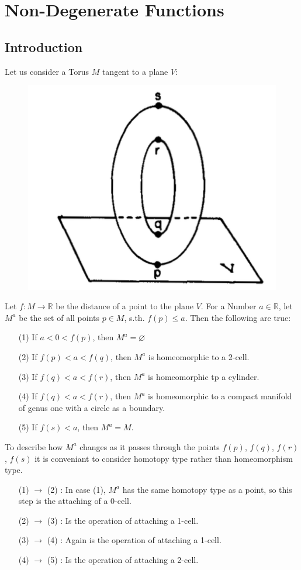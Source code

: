 \documentclass[a4paper,11pt]{article}
\begin{document}
\section{Non-Degenerate Functions}

\subsection{Introduction}

Let us consider a Torus $M$ tangent to a plane $V$:
\begin{figure}[H]
    \centering
    \includegraphics[width=0.4\linewidth]{resources/Diagram1.png}
    \label{fig:diagram1}
\end{figure}
Let $f: M \rightarrow \mathbb{R}$ be the distance of a point to the plane $V$. 
For a Number $a \in \mathbb{R} $, let $M^a$ be the set of all points $p \in M$, s.th. $f(p) \leq a$.
Then the following are true:
\begin{enumerate}
   \item[(1)] If $a < 0 < f(p)$, then $M^a = \varnothing$
   \item[(2)] If $f(p) < a < f(q)$, then $M^a$ is homeomorphic to a 2-cell.
   \item[(3)] If $f(q) < a < f(r)$, then $M^a$ is homeomorphic tp a cylinder.
   \item[(4)] If $f(q) < a < f(r)$, then $M^a$ is homeomorphic to a compact manifold of genus one with a circle as a boundary.
   \item[(5)] If $f(s) < a$, then $M^a = M$.
\end{enumerate}

To describe how $M^a$ changes as it passes through the points $f(p)$, $f(q)$, $f(r)$, $f(s)$ it is conveniant to consider
homotopy type rather than homeomorphism type. 
\begin{enumerate}[leftmargin=2cm]
   \item[(1) $\rightarrow$ (2)]: In case (1), $M^a$ has the same homotopy type as a point, so this step is the attaching of a 0-cell. 
   \item[(2) $\rightarrow$ (3)]: Is the operation of attaching a 1-cell. 
   \item[(3) $\rightarrow$ (4)]: Again is the operation of attaching a 1-cell. 
   \item[(4) $\rightarrow$ (5)]: Is the operation of attaching a 2-cell. 
\end{enumerate}
\end{document}
